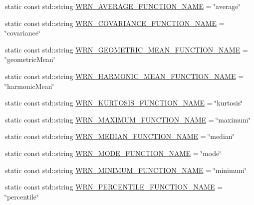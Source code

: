 \begin{DoxyCompactItemize}
\item 
static const std\-::string \hyperlink{classmultiscale_1_1Numeric_a65b22b0d9cb95ff5dde4b7b41f342774}{W\-R\-N\-\_\-\-A\-V\-E\-R\-A\-G\-E\-\_\-\-F\-U\-N\-C\-T\-I\-O\-N\-\_\-\-N\-A\-M\-E} = \char`\"{}average\char`\"{}
\item 
static const std\-::string \hyperlink{classmultiscale_1_1Numeric_a940b0ee737842f9113eb66b7c2cfa4a2}{W\-R\-N\-\_\-\-C\-O\-V\-A\-R\-I\-A\-N\-C\-E\-\_\-\-F\-U\-N\-C\-T\-I\-O\-N\-\_\-\-N\-A\-M\-E} = \char`\"{}covariance\char`\"{}
\item 
static const std\-::string \hyperlink{classmultiscale_1_1Numeric_a96ed0e32f79d8801370a922c8778f436}{W\-R\-N\-\_\-\-G\-E\-O\-M\-E\-T\-R\-I\-C\-\_\-\-M\-E\-A\-N\-\_\-\-F\-U\-N\-C\-T\-I\-O\-N\-\_\-\-N\-A\-M\-E} = \char`\"{}geometric\-Mean\char`\"{}
\item 
static const std\-::string \hyperlink{classmultiscale_1_1Numeric_a48747552d1ae9179e97e3c9b32e86220}{W\-R\-N\-\_\-\-H\-A\-R\-M\-O\-N\-I\-C\-\_\-\-M\-E\-A\-N\-\_\-\-F\-U\-N\-C\-T\-I\-O\-N\-\_\-\-N\-A\-M\-E} = \char`\"{}harmonic\-Mean\char`\"{}
\item 
static const std\-::string \hyperlink{classmultiscale_1_1Numeric_a917a1224a1d3d2dc3ce2937a519b3a03}{W\-R\-N\-\_\-\-K\-U\-R\-T\-O\-S\-I\-S\-\_\-\-F\-U\-N\-C\-T\-I\-O\-N\-\_\-\-N\-A\-M\-E} = \char`\"{}kurtosis\char`\"{}
\item 
static const std\-::string \hyperlink{classmultiscale_1_1Numeric_aa76828c54d236550a16b8b3e189a892a}{W\-R\-N\-\_\-\-M\-A\-X\-I\-M\-U\-M\-\_\-\-F\-U\-N\-C\-T\-I\-O\-N\-\_\-\-N\-A\-M\-E} = \char`\"{}maximum\char`\"{}
\item 
static const std\-::string \hyperlink{classmultiscale_1_1Numeric_a4ff61e6a5c3cd99f6f69a539d8790ec5}{W\-R\-N\-\_\-\-M\-E\-D\-I\-A\-N\-\_\-\-F\-U\-N\-C\-T\-I\-O\-N\-\_\-\-N\-A\-M\-E} = \char`\"{}median\char`\"{}
\item 
static const std\-::string \hyperlink{classmultiscale_1_1Numeric_a1c7fbb1e805d5c6a93c0db380327fb12}{W\-R\-N\-\_\-\-M\-O\-D\-E\-\_\-\-F\-U\-N\-C\-T\-I\-O\-N\-\_\-\-N\-A\-M\-E} = \char`\"{}mode\char`\"{}
\item 
static const std\-::string \hyperlink{classmultiscale_1_1Numeric_abe70187af1f3c5e168ee696836e51940}{W\-R\-N\-\_\-\-M\-I\-N\-I\-M\-U\-M\-\_\-\-F\-U\-N\-C\-T\-I\-O\-N\-\_\-\-N\-A\-M\-E} = \char`\"{}minimum\char`\"{}
\item 
static const std\-::string \hyperlink{classmultiscale_1_1Numeric_a8d81f8548808bc79d7a63913866d848f}{W\-R\-N\-\_\-\-P\-E\-R\-C\-E\-N\-T\-I\-L\-E\-\_\-\-F\-U\-N\-C\-T\-I\-O\-N\-\_\-\-N\-A\-M\-E} = \char`\"{}percentile\char`\"{}

\end{DoxyCompactItemize}
